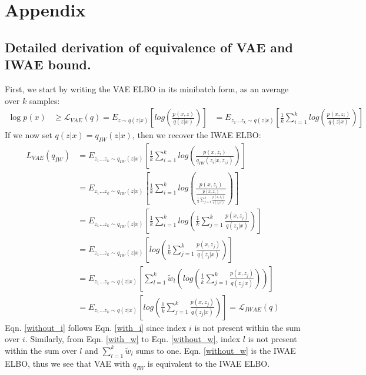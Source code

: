 \documentclass{article} %
\begin{document}
\section{Appendix}




\subsection{Detailed derivation of equivalence of VAE and IWAE bound.}
\label{detailed_derivation}

First, we start by writing the VAE ELBO in its minibatch form, as an average over $k$ samples:
\begin{align} 
    \log p(x) &\geq 
    \mathcal{L}_{VAE}(q) =
    E_{z \sim q(z|x)} \left[  log\left(\frac{p(x,z)}{q(z|x)} \right) \right]  
    &= E_{z_{1}...z_{k} \sim q(z|x)} \left[  \frac{1}{k}\sum_{i=1}^k log\left(\frac{p(x,z_i)}{q(z|x)} \right) \right]
\end{align}
If we now set $q(z|x) = q_{IW}(z|x)$, then we recover the IWAE ELBO:
\begin{align}
    L_{VAE}(q_{IW}) &= E_{z_{1}...z_{k} \sim q_{IW}(z|x)} \left[  \frac{1}{k}\sum_{i=1}^k log\left(\frac{p(x,z_i)}{q_{IW}(z_i|x,z_{\setminus i})}  \right)  \right] \\
    &= E_{z_{1}...z_{k} \sim q_{IW}(z|x)} \left[  \frac{1}{k}\sum_{i=1}^k log\left(\frac{p(x,z_i)}{\frac{p(x,z_i)}{\frac{1}{k}   \sum_{j=1}^k \frac{p(x,z_j)}{q(z_j|x)}}}  \right)  \right] \\
    &= E_{z_{1}...z_{k} \sim q_{IW}(z|x)} \left[  \frac{1}{k}\sum_{i=1}^k log\left(\frac{1}{k} \sum_{j=1}^k \frac{p(x,z_j)}{q(z_j|x)}\right)  \right] \label{with_i} \\
    &= E_{z_{1}...z_{k} \sim q_{IW}(z|x)} \left[ log\left(\frac{1}{k} \sum_{j=1}^k \frac{p(x,z_j)}{q(z_j|x)}\right)  \right]  \label{without_i} \\
    &= E_{z_{1}...z_{k} \sim q(z|x)} \left[  \sum_{l=1}^k \tilde w_l  \left( log\left(\frac{1}{k} \sum_{j=1}^k \frac{p(x,z_j)}{q(z_j|x)}\right)\right)  \right] \label{with_w} \\ 
    &= E_{z_{1}...z_{k} \sim q(z|x)} \left[  log\left(\frac{1}{k}\sum_{j=1}^k \frac{p(x,z_j)}{q(z_j|x)}  \right)  \right] = \mathcal{L}_{IWAE}(q) \label{without_w}
\end{align}
Eqn. \ref{without_i} follows Eqn. \ref{with_i} since index $i$ is not present within the sum over $i$. Similarly, from Eqn. \ref{with_w} to Eqn. \ref{without_w}, index $l$ is not present within the sum over $l$ and $\sum_{l=1}^k \tilde w_l$ sums to one. Eqn. \ref{without_w} is the IWAE ELBO, thus we see that VAE with $q_{IW}$ is equivalent to the IWAE ELBO.
\end{document}
